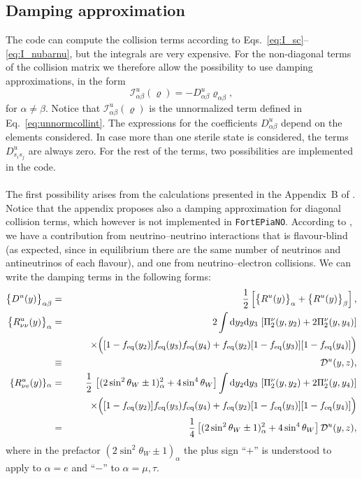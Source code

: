 \documentclass[notitlepage,nofootinbib,showpacs,preprintnumbers,amsmath,amssymb,superscriptaddress,prd,onecolumn]{revtex4-1}
\newcommand{\fortepiano}{\texttt{FortEPiaNO}}
\begin{document}
\subsection*{Damping approximation}
The code can compute the collision terms according to Eqs.~\eqref{eq:I_sc}--\eqref{eq:I_nubarnu},
but the integrals are very expensive.
For the non-diagonal terms of the collision matrix we therefore allow the possibility to use
damping approximations, in the form
%
\begin{equation}
\mathcal{I}^u_{\alpha\beta}(\varrho) = -D^u_{\alpha\beta} \varrho_{\alpha\beta},
\end{equation}
%
for $\alpha \neq \beta$.
Notice that $\mathcal{I}^u_{\alpha\beta}(\varrho)$ is the unnormalized term
defined in Eq.~\eqref{eq:unnormcollint}.
The expressions for the coefficients $D^u_{\alpha\beta}$ depend on the elements considered.
In case more than one sterile state is considered, the terms $D^u_{s_is_j}$ are always zero.
For the rest of the terms, two possibilities are implemented in the code.

\paragraph{}
The first possibility arises from the calculations presented in the Appendix~B of \cite{Bennett:2020zkv}.
Notice that the appendix proposes also a damping approximation for diagonal collision terms,
which however is not implemented in \fortepiano.
According to \cite{Bennett:2020zkv}, we have a contribution from neutrino--neutrino interactions
that is flavour-blind (as expected, since in equilibrium there are the same number of neutrinos
and antineutrinos of each flavour), and one from neutrino--electron collisions.
We can write the damping terms in the following forms:
\begin{eqnarray}
\big\{D^u(y) \big\}_{\alpha \beta}
&=&
\frac{1}{2} \left[\big\{R^u(y) \big\}_\alpha+ \big\{R^u(y) \big\}_\beta \right],
\label{eq:damping_d_r}
\\
\big\{R^u_{\nu \nu}(y) \big\}_{\alpha}
&=&
2
\int {\rm d}y_2 {\rm d}y_3 \,
\left[\Pi_{2}^{\nu}(y, y_2) + 2 \Pi_{2}^{\nu}(y, y_4) \right]
\nonumber\\
&&
\qquad
\times
\Big(
[1-f_{\rm eq}(y_2)] f_{\rm eq}(y_3) f_{\rm eq}(y_4)
+f_{\rm eq}(y_2) [1-f_{\rm eq}(y_3)][1-f_{\rm eq}(y_4)]
\Big)
\nonumber\\
&\equiv&
{\cal D}^u(y,z),
\label{eq:selfdamping}
\\
\{R^u_{\nu e}(y)\}_{\alpha}
&=&
\frac{1}{2} \,
\left[(2 \sin^2 \theta_W \pm 1)^2_\alpha + 4 \sin^4 \theta_W\right]
\int {\rm d}y_2 {\rm d}y_3 \,
\left[\Pi_{2}^{\nu}(y, y_2) + 2 \Pi_{2}^{\nu}(y, y_4) \right]
\nonumber\\
&&
\qquad
\times
\Big(
[1-f_{\rm eq}(y_2)] f_{\rm eq}(y_3) f_{\rm eq}(y_4)
+f_{\rm eq}(y_2) [1-f_{\rm eq}(y_3)][1-f_{\rm eq}(y_4)]
\Big)
\nonumber \\
&=&
\frac{1}{4}
\left[(2 \sin^2 \theta_W \pm 1)^2_\alpha + 4 \sin^4 \theta_W\right] {\cal D}^u(y,z),
\label{eq:nuedampingdiag}
\end{eqnarray}
where in the prefactor $(2 \sin^2 \theta_W\pm 1)_\alpha$  the plus sign ``$+$'' is understood to apply to $\alpha =e$ and ``$-$'' to $\alpha = \mu, \tau$.
\end{document}
